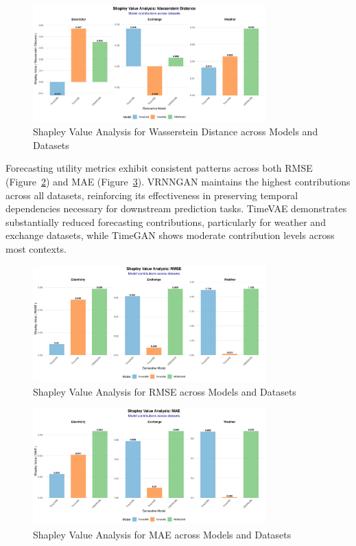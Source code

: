 \documentclass[11pt]{article}
\begin{document}
\begin{figure}[H]
\centering
\includegraphics[width=0.8\textwidth]{assets/shapley_wasserstein_analysis.png}
\caption{Shapley Value Analysis for Wasserstein Distance across Models and Datasets}
\label{fig:shapley_wasserstein}
\end{figure}

Forecasting utility metrics exhibit consistent patterns across both RMSE (Figure~\ref{fig:shapley_rmse}) and MAE (Figure~\ref{fig:shapley_mae}). VRNNGAN maintains the highest contributions across all datasets, reinforcing its effectiveness in preserving temporal dependencies necessary for downstream prediction tasks. TimeVAE demonstrates substantially reduced forecasting contributions, particularly for weather and exchange datasets, while TimeGAN shows moderate contribution levels across most contexts.
\begin{figure}[H]
\centering
\includegraphics[width=0.8\textwidth]{assets/shapley_rmse_analysis.png}
\caption{Shapley Value Analysis for RMSE across Models and Datasets}
\label{fig:shapley_rmse}
\end{figure}

\begin{figure}[H]
\centering
\includegraphics[width=0.8\textwidth]{assets/shapley_mae_analysis.png}
\caption{Shapley Value Analysis for MAE across Models and Datasets}
\label{fig:shapley_mae}
\end{figure}
\end{document}
